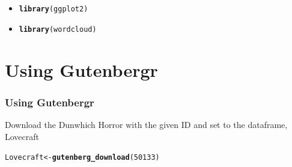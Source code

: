 \documentclass{beamer}\usepackage[]{graphicx}\usepackage[]{color}
\makeatletter
\newcommand{\hlnum}[1]{\textcolor[rgb]{0.686,0.059,0.569}{#1}}%
\newcommand{\hlstd}[1]{\textcolor[rgb]{0.345,0.345,0.345}{#1}}%
\newcommand{\hlkwb}[1]{\textcolor[rgb]{0.69,0.353,0.396}{#1}}%
\newcommand{\hlkwd}[1]{\textcolor[rgb]{0.737,0.353,0.396}{\textbf{#1}}}%
\newenvironment{kframe}{%
 \def\at@end@of@kframe{}%
 \ifinner\ifhmode%
  \def\at@end@of@kframe{\end{minipage}}%
  \begin{minipage}{\columnwidth}%
 \fi\fi%
 \def\FrameCommand##1{\hskip\@totalleftmargin \hskip-\fboxsep
 \colorbox{shadecolor}{##1}\hskip-\fboxsep
     \hskip-\linewidth \hskip-\@totalleftmargin \hskip\columnwidth}%
 \MakeFramed {\advance\hsize-\width
   \@totalleftmargin\z@ \linewidth\hsize
   \@setminipage}}%
 {\par\unskip\endMakeFramed%
 \at@end@of@kframe}
\newenvironment{knitrout}{}{} %
\makeatother
\begin{document}
\begin{frame}[fragile]
\begin{itemize}
\begin{knitrout}
\begin{kframe}
\begin{alltt}
\end{alltt}
\end{kframe}
\end{knitrout}
    \item
\begin{knitrout}
\color{fgcolor}\begin{kframe}
\begin{alltt}
\hlkwd{library}\hlstd{(ggplot2)}
\end{alltt}
\end{kframe}
\end{knitrout}
     \item
\begin{knitrout}
\color{fgcolor}\begin{kframe}
\begin{alltt}
\hlkwd{library}\hlstd{(wordcloud)}
\end{alltt}
\end{kframe}
\end{knitrout}
    \end{itemize}
\end{frame}


\section{Using Gutenbergr}
\begin{frame}[fragile]
  \frametitle{Using Gutenbergr}
  
Download the Dunwhich Horror with the given ID and set to the dataframe, Lovecraft
\begin{knitrout}
\color{fgcolor}\begin{kframe}
\begin{alltt}
\hlstd{Lovecraft}\hlkwb{<-}\hlkwd{gutenberg_download}\hlstd{(}\hlnum{50133}\hlstd{)}
\end{alltt}
\end{kframe}
\end{knitrout}
\end{frame}
\end{document}
